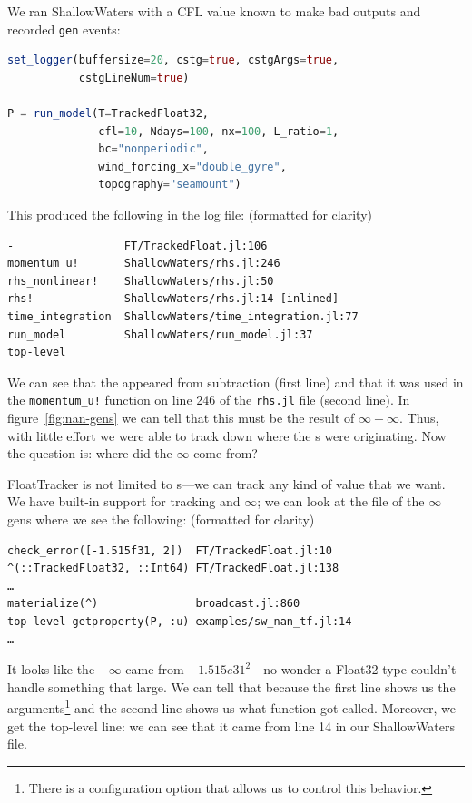 \documentclass{juliacon}
\begin{document}
We ran ShallowWaters with a CFL value known to make bad outputs and recorded \NaN{} \texttt{gen} events:

\begin{lstlisting}[language = Julia]
set_logger(buffersize=20, cstg=true, cstgArgs=true,
           cstgLineNum=true)

P = run_model(T=TrackedFloat32,
              cfl=10, Ndays=100, nx=100, L_ratio=1,
              bc="nonperiodic",
              wind_forcing_x="double_gyre",
              topography="seamount")
\end{lstlisting}

This produced the following in the log file: (formatted for clarity)

\begin{verbatim}
-                 FT/TrackedFloat.jl:106
momentum_u!       ShallowWaters/rhs.jl:246
rhs_nonlinear!    ShallowWaters/rhs.jl:50
rhs!              ShallowWaters/rhs.jl:14 [inlined]
time_integration  ShallowWaters/time_integration.jl:77
run_model         ShallowWaters/run_model.jl:37
top-level
\end{verbatim}

We can see that the \NaN{} appeared from subtraction (first line) and that it was used in the \texttt{momentum\_u!} function on line 246 of the \texttt{rhs.jl} file (second line).
In figure~\ref{fig:nan-gens} we can tell that this must be the result of $\infty - \infty$.
Thus, with little effort we were able to track down where the \NaN{}s were originating.
Now the question is: where did the $\infty$ come from?

FloatTracker is not limited to \NaN{}s---we can track any kind of value that we want.
We have built-in support for tracking \NaN{} and $\infty$; we can look at the file of the $\infty$ gens where we see the following: (formatted for clarity)

\begin{verbatim}
check_error([-1.515f31, 2])  FT/TrackedFloat.jl:10
^(::TrackedFloat32, ::Int64) FT/TrackedFloat.jl:138
…
materialize(^)               broadcast.jl:860
top-level getproperty(P, :u) examples/sw_nan_tf.jl:14
…
\end{verbatim}

It looks like the $-\infty$ came from $-1.515e31^2$---no wonder a Float32 type couldn't handle something that large.
We can tell that because the first line shows us the arguments\footnote{There is a configuration option that allows us to control this behavior.} and the second line shows us what function got called. Moreover, we get the top-level line: we can see that it came from line 14 in our ShallowWaters file.
\end{document}
